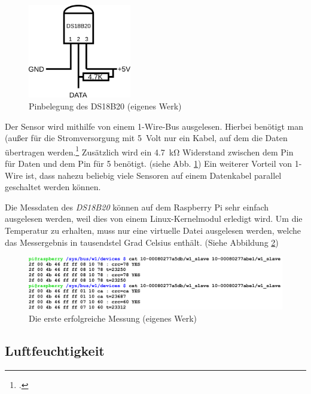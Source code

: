 \begin{figure}[h]
  \centering
     \includegraphics[width=0.4\textwidth]{figures/temp_pin.png}
  \caption{Pinbelegung des DS18B20 (eigenes Werk)}
  \label{fig:temp_pin}
\end{figure}

Der Sensor wird mithilfe von einem 1-Wire-Bus ausgelesen. Hierbei benötigt man (außer für die Stromversorgung mit \SI{5}{\gls{Volt}} nur ein Kabel, auf dem die Daten übertragen werden.\footcite{1-wire} Zusätzlich wird ein \SI{4.7}{\kilo\ohm} Widerstand zwischen dem Pin für Daten und dem Pin für \SI[retain-explicit-plus]{+5}{} benötigt. (siehe Abb. \ref{fig:temp_pin})
Ein weiterer Vorteil von 1-Wire ist, dass nahezu beliebig viele Sensoren auf einem Datenkabel parallel geschaltet werden können.

Die Messdaten des \textit{DS18B20} können auf dem Raspberry Pi sehr einfach ausgelesen werden, weil dies von einem Linux-\gls{Kernelmodul} erledigt wird. Um die Temperatur zu erhalten, muss  nur eine virtuelle Datei ausgelesen werden, welche das Messergebnis in tausendstel Grad Celsius enthält. (Siehe Abbildung \ref{fig:temp_screenshot})

\begin{figure}[h]
  \centering
     \includegraphics[width=\textwidth]{figures/temp_screenshot.png}
  \caption{Die erste erfolgreiche Messung (eigenes Werk)}
  \label{fig:temp_screenshot}
\end{figure}

\subsection{Luftfeuchtigkeit}
\label{subsec:Luftfeuchtigkeit}

